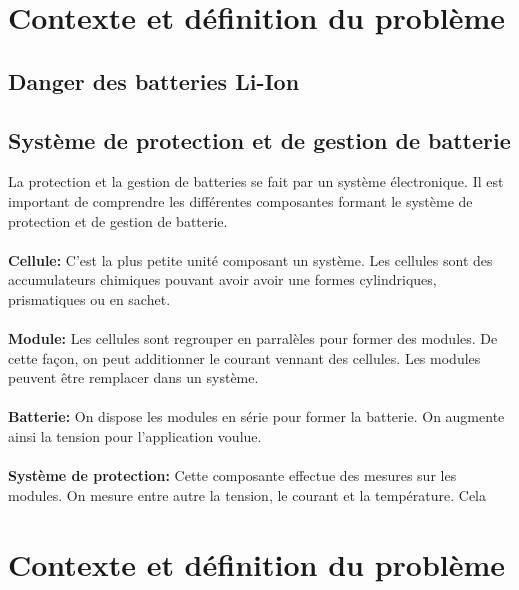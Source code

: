 \section{Contexte et définition du problème}


	\subsection{Danger des batteries Li-Ion}
	
	\subsection{Système de protection et de gestion de batterie}
	
	La protection et la gestion de batteries se fait par un système électronique. Il est important de comprendre les différentes composantes formant le système de protection et de gestion de batterie.
	
		\paragraph{}
		\textbf{Cellule:} C'est la plus petite unité composant un système. Les cellules sont des accumulateurs chimiques pouvant avoir avoir une formes cylindriques, prismatiques ou en sachet.  
		
		\paragraph{}
		\textbf{Module:} Les cellules sont regrouper en parralèles pour former des modules. De cette façon, on peut additionner le courant vennant des cellules. Les modules peuvent être remplacer dans un système.
		
		\paragraph{}
		\textbf{Batterie:} On dispose les modules en série pour former la batterie. On augmente ainsi la tension pour l'application voulue.
		
		\paragraph{}
		\textbf{Système de protection:} Cette composante effectue des mesures sur les modules. On mesure entre autre la tension, le courant et la température. Cela \section{Contexte et définition du problème}
		
